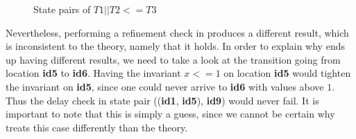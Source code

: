 \begin{figure}
\caption{State pairs of $T1||T2<=T3$}
\label{fig:statePairsT1T2T3}
\end{figure}
Nevertheless, performing a {refinement} check in  produces a different result, which is inconsistent to the theory, namely that it holds. In order to explain why  ends up having different results, we need to take a look at the transition going from location \textbf{id5} to \textbf{id6}. Having the invariant $x<=1$ on location \textbf{id5} would tighten the invariant on \textbf{id5}, since one could never arrive to \textbf{id6} with values above $1$. Thus the delay check in state pair ((\textbf{id1}, \textbf{id5}), \textbf{id9}) would never fail. It is important to note that this is simply a guess, since we cannot be certain why  treats this case differently than the theory.

